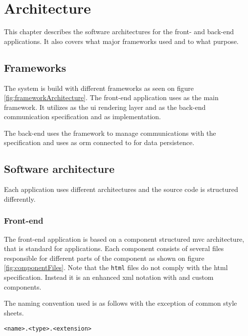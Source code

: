 \chapter{Architecture}
This chapter describes the software architectures for the front- and back-end applications.
It also covers what major frameworks used and to what purpose.

\section{Frameworks}
The system is build with different frameworks as seen on figure  \ref{fig:frameworkArchitecture}.
The front-end application uses  as the main framework.
It utilizes  as the \gls{ui} rendering layer and  as the back-end communication specification and  as  implementation.

The back-end uses the  framework to manage communications with the  specification and uses  as \gls{orm} connected to  for data persistence.


\section{Software architecture}
Each application uses different architectures and the source code is structured differently.

\subsection{Front-end}
The front-end application is based on a component structured \gls{mvc} architecture, that is standard for  applications.
Each component consists of several files responsible for different parts of the component as shown on figure \ref{fig:componentFiles}.
Note that the \verb+html+ files do not comply with the \gls{html} specification.
Instead it is an enhanced \gls{xml} notation with  and custom components.


The naming convention used is as follows with the exception of common style sheets.

\verb+<name>.<type>.<extension>+

